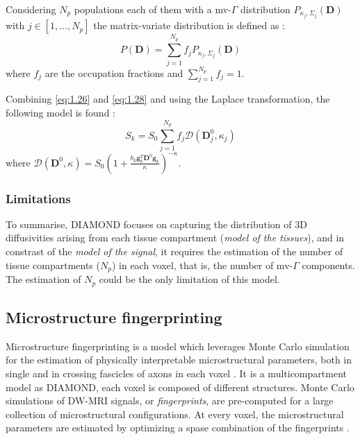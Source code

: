  Considering $N_p$ populations each of them with a mv-$\Gamma$ distribution $P_{\kappa_j,\Sigma_j}(\mathbf{D})$ with $j \in [1,...,N_p]$ the matrix-variate distribution is defined as \cite{scherrer2016diamond}:
 \begin{equation}\label{eq:1.28}
   P(\mathbf{D}) = \sum_{j=1}^{N_p} f_j P_{\kappa_j,\Sigma_j}(\mathbf{D})
 \end{equation} 
 where $f_j$ are the occupation fractions and $\sum_{j=1}^{N_p} f_j = 1$. 

 Combining \ref{eq:1.26} and \ref{eq:1.28} and using the Laplace transformation, the following model is found \cite{scherrer2016diamond}:
 \begin{equation}
   S_k=S_0 \sum_{j=1}^{N_p} f_j \mathcal{D}(\mathbf{D}^0_j, \kappa_j)
 \end{equation}
 where $\mathcal{D}(\mathbf{D}^0,\kappa) = S_0 (1+\frac{b_k\mathbf{g}_k^T\mathbf{D}^0\mathbf{g}_k}{\kappa})^{-\kappa}$.

  \subsubsection*{Limitations}
  To summarise, DIAMOND focuses on capturing the distribution of 3D diffusivities arising from each tissue compartment (\emph{model of the tissues}), and in constrast of the \emph{model of the signal}, it requires the estimation of the number of tissue compartments ($N_p$) in each voxel, that is, the number of mv-$\Gamma$ components. The estimation of $N_p$ could be the only limitation of this model.
 \subsection{Microstructure fingerprinting}
 Microstructure fingerprinting is a model which leverages Monte Carlo simulation for the estimation of physically interpretable microstructural parameters, both in single and in crossing fascicles of axons in each voxel \cite{rensonnet2019towards}. It is a multicompartment model as DIAMOND, each voxel is composed of different structures. Monte Carlo simulations of DW-MRI signals, or \emph{fingerprints}, are pre-computed for a large collection of microstructural configurations. At every voxel, the microstructural parameters are estimated by optimizing a spase combination of the fingerprints \cite{rensonnet2019towards}.

